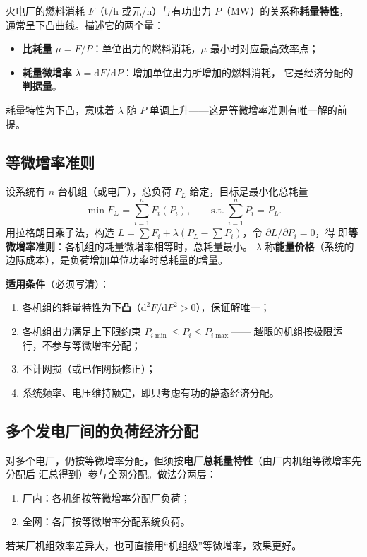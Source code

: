 火电厂的燃料消耗 $F$（t/h 或元/h）与有功出力 $P$（MW）的关系称\textbf{耗量特性}，
通常呈下凸曲线。描述它的两个量：
\begin{itemize}
  \item \textbf{比耗量} $\mu=F/P$：单位出力的燃料消耗，$\mu$ 最小时对应最高效率点；
  \item \textbf{耗量微增率} $\lambda=\mathrm{d}F/\mathrm{d}P$：增加单位出力所增加的燃料消耗，
        它是经济分配的\textbf{判据量}。
\end{itemize}
耗量特性为下凸，意味着 $\lambda$ 随 $P$ 单调上升——这是等微增率准则有唯一解的前提。

\subsection{等微增率准则}

设系统有 $n$ 台机组（或电厂），总负荷 $P_L$ 给定，目标是最小化总耗量
\begin{equation}
  \min F_{\Sigma}=\sum_{i=1}^{n}F_i\left(P_i\right),
  \qquad \text{s.t.}\ \sum_{i=1}^{n}P_i=P_L .
\end{equation}
用拉格朗日乘子法，构造 $L=\sum F_i+\lambda\left(P_L-\sum P_i\right)$，令 $\partial L/\partial P_i=0$，得
即\textbf{等微增率准则}：各机组的耗量微增率相等时，总耗量最小。
$\lambda$ 称\textbf{能量价格}（系统的边际成本），是负荷增加单位功率时总耗量的增量。

\textbf{适用条件}（必须写清）：
\begin{enumerate}
  \item 各机组的耗量特性为\textbf{下凸}（$\mathrm{d}^{2}F/\mathrm{d}P^{2}>0$），保证解唯一；
  \item 各机组出力满足上下限约束 $P_{i\min}\le P_i\le P_{i\max}$——
        越限的机组按极限运行，不参与等微增率分配；
  \item 不计网损（或已作网损修正）；
  \item 系统频率、电压维持额定，即只考虑有功的静态经济分配。
\end{enumerate}

\subsection{多个发电厂间的负荷经济分配}

对多个电厂，仍按等微增率分配，但须按\textbf{电厂总耗量特性}（由厂内机组等微增率先分配后
汇总得到）参与全网分配。做法分两层：
\begin{enumerate}
  \item 厂内：各机组按等微增率分配厂负荷；
  \item 全网：各厂按等微增率分配系统负荷。
\end{enumerate}
若某厂机组效率差异大，也可直接用“机组级”等微增率，效果更好。

